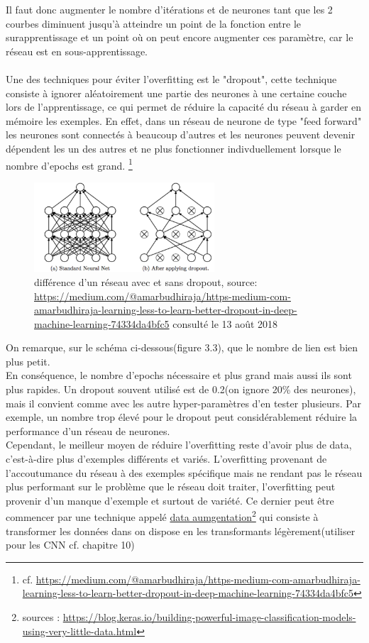 \documentclass[openany,14pt,fleqn]{book} %
\begin{document}
Il faut donc augmenter le nombre d'itérations et de neurones tant que les 2 courbes diminuent jusqu'à atteindre un point de la fonction entre le surapprentissage et un point où on peut encore augmenter ces paramètre, car le réseau est en sous-apprentissage.\\ \\
Une des techniques pour éviter l'overfitting est le "dropout", cette technique consiste à ignorer aléatoirement une partie des neurones à une certaine couche lors de l'apprentissage, ce qui permet de réduire la capacité du réseau à garder en mémoire les exemples. En effet, dans un réseau de neurone de type "feed forward" les neurones sont connectés à beaucoup d'autres et les neurones peuvent devenir dépendent les un des autres et ne plus fonctionner indivduellement lorsque le nombre d'epochs est grand.\cite{dropout} \footnote{cf. \url{https://medium.com/@amarbudhiraja/https-medium-com-amarbudhiraja-learning-less-to-learn-better-dropout-in-deep-machine-learning-74334da4bfc5}}\\
\begin{figure}[h]
\centering\includegraphics[width=0.6\textwidth]{Pictures/dropout.png}
\caption{différence d'un réseau avec et sans dropout, source: \url{https://medium.com/@amarbudhiraja/https-medium-com-amarbudhiraja-learning-less-to-learn-better-dropout-in-deep-machine-learning-74334da4bfc5} consulté le 13 août 2018}
\end{figure}
On remarque, sur le schéma ci-dessous(figure 3.3), que le nombre de lien est bien plus petit.\\ En conséquence, le nombre d'epochs nécessaire et plus grand mais aussi ils sont plus rapides. 
Un dropout souvent utilisé est de 0.2(on ignore 20\% des neurones), mais il convient comme avec les autre hyper-paramètres d'en tester plusieurs. Par exemple, un nombre trop élevé pour le dropout peut considérablement réduire la performance d'un réseau de neurones.\\
Cependant, le meilleur moyen de réduire l'overfitting reste d'avoir plus de data, c'est-à-dire plus d'exemples différents et variés. L'overfitting provenant de l’accoutumance du réseau à des exemples spécifique mais ne rendant pas le réseau plus performant sur le problème que le réseau doit traiter, l'overfitting peut provenir d'un manque d'exemple et surtout de variété. Ce dernier peut être commencer par une technique appelé \underline{data aumgentation}\footnote{sources : \url{https://blog.keras.io/building-powerful-image-classification-models-using-very-little-data.html}} qui consiste à transformer les données dans on dispose en les transformants légèrement(utiliser pour les CNN cf. chapitre 10)
\end{document}
